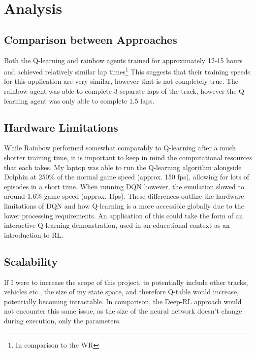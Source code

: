 \section{Analysis}
\subsection{Comparison between Approaches}
Both the Q-learning and rainbow agents trained for approximately 12-15 hours and achieved relatively similar lap times\footnote{In comparison to the WR} This suggests that their training speeds for this application are very similar, however that is not completely true. The rainbow agent was able to complete 3 separate laps of the track, however the Q-learning agent was only able to complete 1.5 laps.
\subsection{Hardware Limitations}
While Rainbow performed somewhat comparably to Q-learning after a much shorter training time, it is important to keep in mind the computational resources that each takes. My laptop was able to run the Q-learning algorithm alongside Dolphin at 250\% of the normal game speed (approx. 150 fps), allowing for lots of episodes in a short time. When running DQN however, the emulation slowed to around 1.6\% game speed (approx. 1fps). These differences outline the hardware limitations of DQN and how Q-learning is a more accessible globally due to the lower processing requirements. An application of this could take the form of an interactive Q-learning demonstration, used in an educational context as an introduction to RL.
\subsection{Scalability}
If I were to increase the scope of this project, to potentially include other tracks, vehicles etc.,  the size of my state space, and therefore Q-table would increase, potentially becoming intractable. In comparison, the Deep-RL approach would not encounter this same issue, as the size of the neural network doesn't change during execution, only the parameters.    